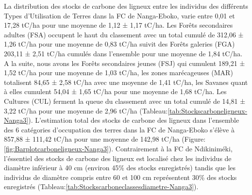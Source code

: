 \documentclass[
  12pt,
  a4paper,
  extrafontsizes,
  onecolumn,
  openright]{book}
\theoremstyle{definition}
\theoremstyle{definition}
\theoremstyle{definition}
\theoremstyle{definition}
\theoremstyle{remark}
\begin{document}
\begin{table}
\centering
\caption{\label{tab:Stocksmoyensligneux-Ndiki3}Calcul des stocks moyens de carbone des ligneux dans les TUT de la FC de Ndikiniméki.}
\centering
{}
\end{table}

La distribution des stocks de carbone des ligneux entre les individus des différents Types d'Utilisation de Terres dans la FC de Nanga-Eboko, varie entre 0,01 et 17,28 tC/ha pour une moyenne de 1,12 ± 1,17 tC/ha. Les Forêts secondaires adultes (FSA) occupent le haut du classement avec un total cumulé de 312,06 ± 1,26 tC/ha pour une moyenne de 0,83 tC/ha suivit des Forêts galeries (FGA) 203,11 ± 2,51 tC/ha cumulés dans l'ensemble pour une moyenne de 1,84 tC/ha. A la suite, nous avons les Forêts secondaires jeunes (FSJ) qui cumulent 189,21 ± 1,52 tC/ha pour une moyenne de 1,03 tC/ha, les zones marécageuses (MAR) totalisent 84,65 ± 2,58 tC/ha avec une moyenne de 1,41 tC/ha, les Savanes quant à elles cumulent 54,04 ± 1,65 tC/ha pour une moyenne de 1,68 tC/ha. Les Cultures (CUL) ferment la queue du classement avec un total cumulé de 14,81 ± 3,22 tC/ha pour une moyenne de 2,96 tC/ha (Tableau:\ref{tab:Stockscarboneligneux-Nanga3}). L'estimation total des stocks de carbone des ligneux dans l'ensemble des 6 catégories d'occupation des terres dans la FC de Nanga-Eboko s'élève à 857,88 ± 111,42 tC/ha pour une moyenne de 142,98 tC/ha (Figure:\ref{fig:Barplotcarboneligneux-Nanga3}). Contrairement à la FC de Ndikiniméki, l'éssentiel des stocks de carbone des ligneux est localisé chez les individus de diamètre inférieur à 40 cm (environ 45\% des stocks enregistrés) tandis que les individus de diamètre compris entre 60 et 100 cm représentent 30\% des stocks enregistrés (Tableau:\ref{tab:Stockscarboneclassesdiametre-Nanga3}).
\end{document}
